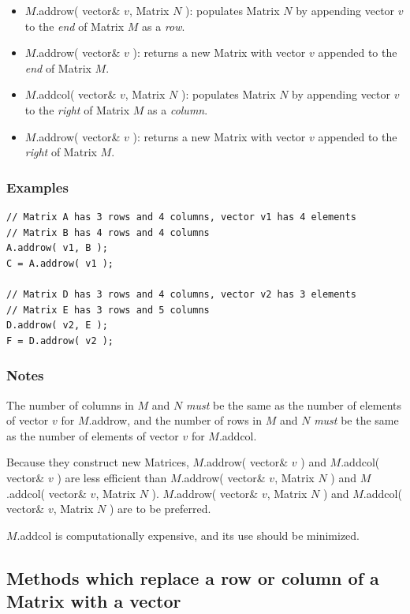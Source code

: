 \documentclass{report}
\begin{document}
\begin{itemize}
\item $M$.addrow( vector\& $v$, Matrix $N$ ): populates Matrix $N$ by
      appending vector $v$ to the {\em end} of Matrix $M$ as a {\em
      row}.
\item $M$.addrow( vector\& $v$ ): returns a new Matrix with vector $v$
      appended to the {\em end} of Matrix $M$.
\item $M$.addcol( vector\& $v$, Matrix $N$ ): populates Matrix $N$ by
      appending vector $v$ to the {\em right} of Matrix $M$ as a {\em
      column}.
\item $M$.addrow( vector\& $v$ ): returns a new Matrix with vector $v$
      appended to the {\em right} of Matrix $M$.
\end{itemize}

\subsubsection{Examples}

\begin{verbatim}
// Matrix A has 3 rows and 4 columns, vector v1 has 4 elements
// Matrix B has 4 rows and 4 columns
A.addrow( v1, B );
C = A.addrow( v1 );

// Matrix D has 3 rows and 4 columns, vector v2 has 3 elements
// Matrix E has 3 rows and 5 columns
D.addrow( v2, E );
F = D.addrow( v2 );
\end{verbatim}

\subsubsection{Notes}

The number of columns in $M$ and $N$ {\em must} be the same as the
number of elements of vector $v$ for $M$.addrow, and the number of
rows in $M$ and $N$ {\em must} be the same as the number of elements
of vector $v$ for $M$.addcol.

Because they construct new Matrices, $M$.addrow( vector\& $v$ ) and
$M$.addcol( vector\& $v$ ) are less efficient than $M$.addrow(
vector\& $v$, Matrix $N$ ) and $M$.addcol( vector\& $v$, Matrix $N$ ).
$M$.addrow( vector\& $v$, Matrix $N$ ) and $M$.addcol( vector\& $v$,
Matrix $N$ ) are to be preferred.

$M$.addcol is computationally expensive, and its use should be
minimized.

\subsection{Methods which replace a row or column of a Matrix with a
vector}
\end{document}
